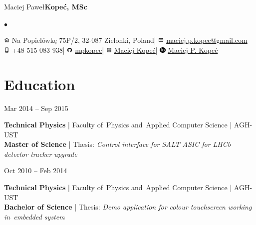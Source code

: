 \documentclass[11pt,a4paper,sans]{article}
\makeatletter
\newcommand{\twhorline}[1]{\noindent\makebox[\linewidth]{\rule{\textwidth}{#1}}}
\newcommand{\cvedudateitem}[6]{

	\noindent
	\begin{minipage}[t]{0.22\linewidth}
		#1
	\end{minipage}
	\hfill
	\begin{minipage}[t]{0.76\linewidth}
		{\bfseries #2} | #3 | #4\\
		\textbf{#5} | Thesis: \emph{#6}
	\end{minipage}
	\vspace{1\baselineskip}

}
\newcommand{\firstname}{Maciej Paweł}
\newcommand{\familyname}{Kopeć}
\newcommand{\address}{Na Popielówkę 75P/2, 32-087 Zielonki, Poland}
\newcommand{\mobile}{+48 515 083 938}
\newcommand{\email}{\href{mailto:maciej.p.kopec@gmail.com}{maciej.p.kopec@gmail.com}}
\newcommand{\github}{\href{https://github.com/mpkopec}{mpkopec}}
\newcommand{\linkedin}{\href{https://www.linkedin.com/in/maciej-kope\%C4\%87-46735595/}{Maciej Kopeć}}
\newcommand{\orcid}{\href{https://orcid.org/0000-0002-1892-0417}{Maciej P. Kopeć}}
\makeatother
\begin{document}
	\begin{center}
		{\Huge \firstname \space \bfseries \familyname \normalfont, MSc}
		\vspace{1\baselineskip}

		\large
		\renewcommand*{\do}[1]{$\bullet$ #1 }
		$\bullet$
		\vspace{0.2\baselineskip}
		\twhorline{1pt}

		\vspace{0.25\baselineskip}
		\includegraphics[height=0.8em]{img/icons8-home-96.png}
		\address \space |
		\includegraphics[height=0.8em]{img/icons8-envelope-96.png}
		\email \\[.3em]

		\includegraphics[height=0.8em]{img/icons8-iphone-96.png}
		\mobile \space |
		\includegraphics[height=0.8em]{img/icons8-github-96.png}
		\github \space |
		\includegraphics[height=0.8em]{img/icons8-linkedin-96.png}
		\linkedin \space |
		\includegraphics[height=0.8em]{img/orcid-128.png}
		\orcid

		\twhorline{1pt}

	\end{center}

	\section{Education}
	\cvedudateitem
		{Mar 2014 -- Sep 2015}
		{Technical Physics}
		{Faculty of~Physics and~Applied Computer Science}
		{AGH-UST}
		{Master of Science}
		{Control interface for SALT ASIC for LHCb detector tracker upgrade}
	\cvedudateitem
		{Oct 2010 -- Feb 2014}
		{Technical Physics}
		{Faculty of~Physics and~Applied Computer Science}
		{AGH-UST}
		{Bachelor of Science}
		{Demo application for colour touchscreen working in~embedded system}
\end{document}
